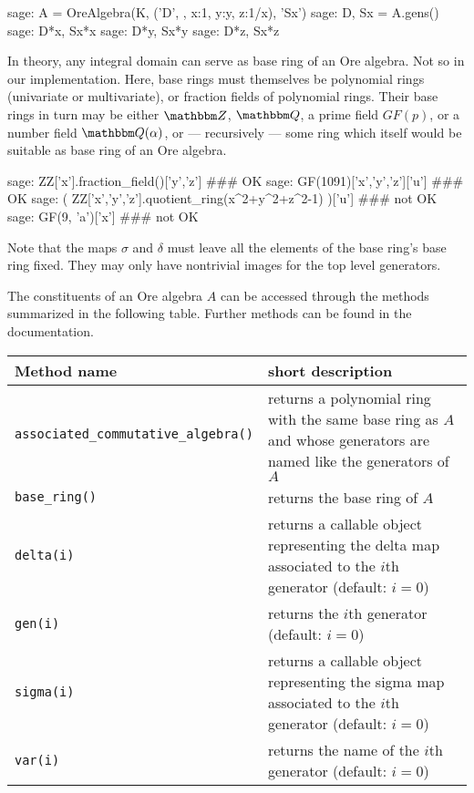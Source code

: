 \documentclass[11pt]{amsart}
\let\set\mathbbm
\begin{document}
\begin{sageexample}
  sage: A = OreAlgebra(K, ('D', {}, {x:1, y:y, z:1/x}), 'Sx')
  sage: D, Sx = A.gens()
  sage: D*x, Sx*x
  sage: D*y, Sx*y
  sage: D*z, Sx*z
\end{sageexample}

In theory, any integral domain can serve as base ring of an Ore algebra. Not so
in our implementation. Here, base rings must themselves be polynomial rings
(univariate or multivariate), or fraction fields of polynomial rings. Their base
rings in turn may be either $\set Z$, $\set Q$, a prime field $GF(p)$, or a
number field $\set Q(\alpha)$, or --- recursively --- some ring which itself
would be suitable as base ring of an Ore algebra.

\begin{sageexample}
  sage: ZZ['x'].fraction_field()['y','z'] ### OK
  sage: GF(1091)['x','y','z']['u'] ### OK
  sage: ( ZZ['x','y','z'].quotient_ring(x^2+y^2+z^2-1) )['u'] ### not OK
  sage: GF(9, 'a')['x'] ### not OK
\end{sageexample}

Note that the maps $\sigma$ and $\delta$ must leave all the elements of
the base ring's base ring fixed. They may only have nontrivial images for
the top level generators. 

The constituents of an Ore algebra $A$ can be accessed through the methods
summarized in the following table. Further methods can be found in the 
documentation. 

\begin{center}
  \begin{tabular}{|l|p{.5\hsize}|}
    \hline
    Method name & short description \\\hline
    \verb|associated_commutative_algebra()| & returns a polynomial ring with the
       same base ring as $A$ and whose generators are named like the generators
       of~$A$\\
    \verb|base_ring()| & returns the base ring of $A$\\
    \verb|delta(i)| & returns a callable object representing the delta map
       associated to the $i$th generator (default: $i=0$) \\
    \verb|gen(i)| & returns the $i$th generator (default: $i=0$)\\
    \verb|sigma(i)| & returns a callable object representing the sigma map
       associated to the $i$th generator (default: $i=0$) \\
    \verb|var(i)| & returns the name of the $i$th generator (default: $i=0$)\\\hline
  \end{tabular}
\end{center}
\end{document}
